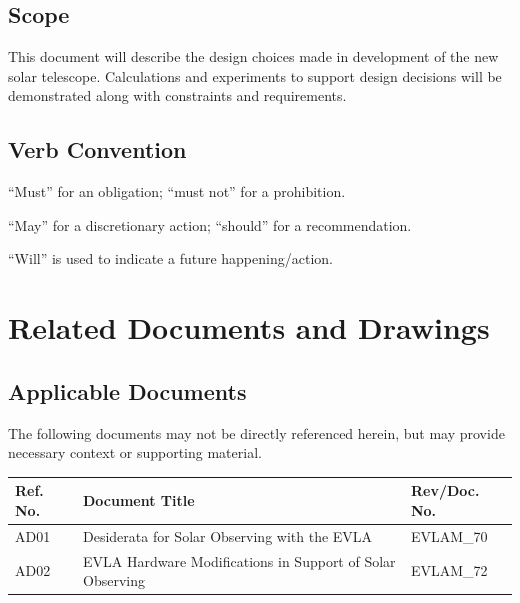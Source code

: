\documentclass[titlepage]{article}
\begin{document}
\subsection{Scope}
This document will describe the design choices made in development of the new solar telescope. Calculations and experiments to support design decisions will be demonstrated along with constraints and requirements.

\subsection{Verb Convention}
“Must” for an obligation; “must not” for a prohibition. 

“May” for a discretionary action; “should” for a recommendation. 

“Will” is used to indicate a future happening/action. 


\section{Related Documents and Drawings}
\subsection{Applicable Documents}
The following documents may not be directly referenced herein, but may provide necessary context or supporting material.
\begin{center}
\begin{tabular}{|m{2cm}|m{8cm}|m{3cm}|} \hline
    \rowcolor{nraoblue}
    Ref. No. & Document Title & Rev/Doc. No.\\ \hline
    AD01 & Desiderata for Solar Observing with the EVLA & EVLAM\_70 \\ 
    \hline
    AD02 & EVLA Hardware Modifications in Support of Solar Observing & EVLAM\_72 \\
    \hline
\end{tabular}
\end{center}
\end{document}
